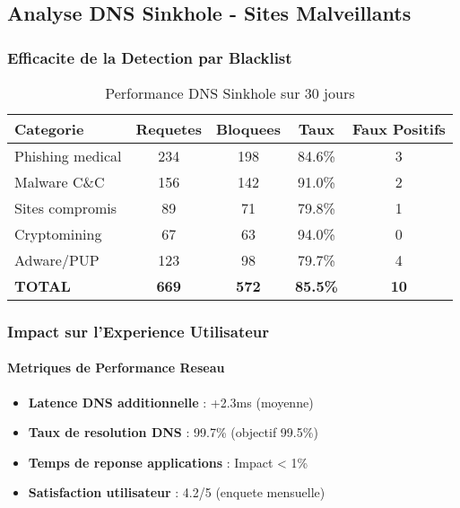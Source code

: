 \subsection{Analyse DNS Sinkhole - Sites Malveillants}

\subsubsection{Efficacite de la Detection par Blacklist}

\begin{table}[H]
    \centering
    \caption{Performance DNS Sinkhole sur 30 jours}
    \begin{tabular}{|l|c|c|c|c|}
        \hline
        \textbf{Categorie} & \textbf{Requetes} & \textbf{Bloquees} & \textbf{Taux}   & \textbf{Faux Positifs} \\
        \hline
        Phishing medical   & 234               & 198               & 84.6\%          & 3                      \\
        \hline
        Malware C\&C       & 156               & 142               & 91.0\%          & 2                      \\
        \hline
        Sites compromis    & 89                & 71                & 79.8\%          & 1                      \\
        \hline
        Cryptomining       & 67                & 63                & 94.0\%          & 0                      \\
        \hline
        Adware/PUP         & 123               & 98                & 79.7\%          & 4                      \\
        \hline
        \textbf{TOTAL}     & \textbf{669}      & \textbf{572}      & \textbf{85.5\%} & \textbf{10}            \\
        \hline
    \end{tabular}
\end{table}

\subsubsection{Impact sur l'Experience Utilisateur}

\paragraph{Metriques de Performance Reseau}

\begin{itemize}
    \item \textbf{Latence DNS additionnelle} : +2.3ms (moyenne)
    \item \textbf{Taux de resolution DNS} : 99.7\% (objectif 99.5\%)
    \item \textbf{Temps de reponse applications} : Impact < 1\%
    \item \textbf{Satisfaction utilisateur} : 4.2/5 (enquete mensuelle)
\end{itemize}

